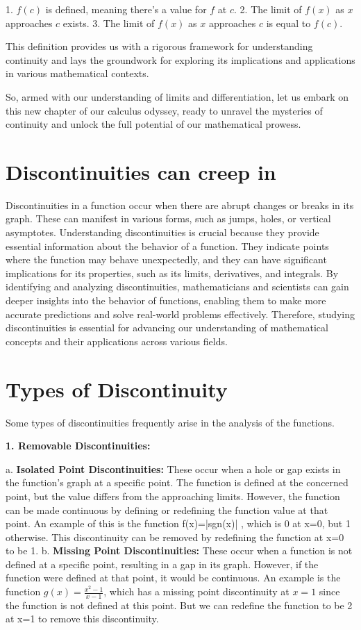 1. \( f(c) \) is defined, meaning there's a value for \( f \) at \( c \).
2. The limit of \( f(x) \) as \( x \) approaches \( c \) exists.
3. The limit of \( f(x) \) as \( x \) approaches \( c \) is equal to \( f(c) \).

This definition provides us with a rigorous framework for understanding continuity and lays the groundwork for exploring its implications and applications in various mathematical contexts.

So, armed with our understanding of limits and differentiation, let us embark on this new chapter of our calculus odyssey, ready to unravel the mysteries of continuity and unlock the full potential of our mathematical prowess.

\section{Discontinuities can creep in}

Discontinuities in a function occur when there are abrupt changes or breaks in its graph. These can manifest in various forms, such as jumps, holes, or vertical asymptotes. Understanding discontinuities is crucial because they provide essential information about the behavior of a function. They indicate points where the function may behave unexpectedly, and they can have significant implications for its properties, such as its limits, derivatives, and integrals. By identifying and analyzing discontinuities, mathematicians and scientists can gain deeper insights into the behavior of functions, enabling them to make more accurate predictions and solve real-world problems effectively. Therefore, studying discontinuities is essential for advancing our understanding of mathematical concepts and their applications across various fields.

\section{Types of Discontinuity}

Some types of discontinuities frequently arise in the analysis of the functions.

\textbf{1. Removable Discontinuities:}

   a. \textbf{Isolated Point Discontinuities:} These occur when a hole or gap exists in the function's graph at a specific point. The function is defined at the concerned point, but the value differs from the approaching limits. However, the function can be made continuous by defining or redefining the function value at that point. An example of this is the function f(x)=|sgn(x)| , which is 0 at x=0, but 1 otherwise. This discontinuity can be removed by redefining the function at x=0 to be 1.    
   b. \textbf{Missing Point Discontinuities:} These occur when a function is not defined at a specific point, resulting in a gap in its graph. However, if the function were defined at that point, it would be continuous. An example is the function \( g(x) = \frac{x^2-1}{x-1} \), which has a missing point discontinuity at \( x = 1 \) since the function is not defined at this point. But we can redefine the function to be 2 at x=1 to remove this discontinuity.

